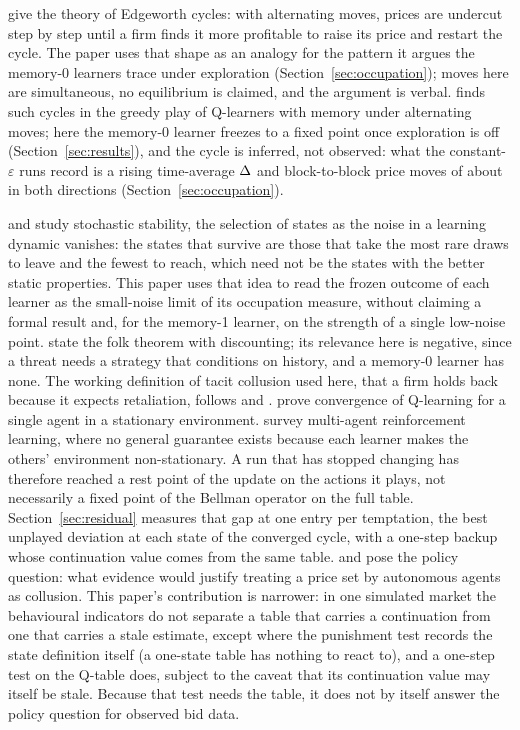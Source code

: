 \citet{maskin1988} give the theory of Edgeworth cycles: with alternating moves, prices are undercut step by step until a firm finds it more profitable to raise its price and restart the cycle. The paper uses that shape as an analogy for the pattern it argues the memory-0 learners trace under exploration (Section~\ref{sec:occupation}); moves here are simultaneous, no equilibrium is claimed, and the argument is verbal. \citet{klein2021} finds such cycles in the greedy play of Q-learners with memory under alternating moves; here the memory-0 learner freezes to a fixed point once exploration is off (Section~\ref{sec:results}), and the cycle is inferred, not observed: what the constant-$\varepsilon$ runs record is a rising time-average $\Delta$ and block-to-block price moves of about  in both directions (Section~\ref{sec:occupation}). 

\citet{young1993} and \citet{kandori1993} study stochastic stability, the selection of states as the noise in a learning dynamic vanishes: the states that survive are those that take the most rare draws to leave and the fewest to reach, which need not be the states with the better static properties.
 This paper uses that idea to read the frozen outcome of each learner as the small-noise limit of its occupation measure, without claiming a formal result and, for the memory-1 learner, on the strength of a single low-noise point. \citet{fudenberg1986} state the folk theorem with discounting; its relevance here is negative, since a threat needs a strategy that conditions on history, and a memory-0 learner has none. The working definition of tacit collusion used here, that a firm holds back because it expects retaliation, follows \citet{tirole1988} and \citet{ivaldi2003}. \citet{watkins1992} prove convergence of Q-learning for a single agent in a stationary environment. \citet{busoniu2008} survey multi-agent reinforcement learning, where no general guarantee exists because each learner makes the others' environment non-stationary. A run that has stopped changing has therefore reached a rest point of the update on the actions it plays, not necessarily a fixed point of the Bellman operator on the full table. Section~\ref{sec:residual} measures that gap at one entry per temptation, the best unplayed deviation at each state of the converged cycle, with a one-step backup whose continuation value comes from the same table. \citet{oecd2017} and \citet{harrington2018} pose the policy question: what evidence would justify treating a price set by autonomous agents as collusion. This paper's contribution is narrower: in one simulated market the behavioural indicators do not separate a table that carries a continuation from one that carries a stale estimate, except where the punishment test records the state definition itself (a one-state table has nothing to react to), and a one-step test on the Q-table does, subject to the caveat that its continuation value may itself be stale. Because that test needs the table, it does not by itself answer the policy question for observed bid data.
